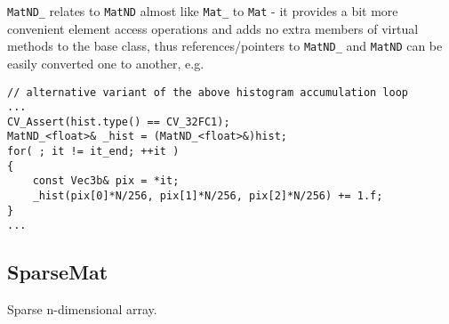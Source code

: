 \texttt{MatND\_} relates to \texttt{MatND}  almost like \texttt{Mat\_} to \texttt{Mat} - it provides a bit more convenient element access operations and adds no extra members of virtual methods to the base class, thus references/pointers to \texttt{MatND\_} and \texttt{MatND} can be easily converted one to another, e.g.

\begin{lstlisting}
// alternative variant of the above histogram accumulation loop
...
CV_Assert(hist.type() == CV_32FC1);
MatND_<float>& _hist = (MatND_<float>&)hist;
for( ; it != it_end; ++it )
{
    const Vec3b& pix = *it;
    _hist(pix[0]*N/256, pix[1]*N/256, pix[2]*N/256) += 1.f;
}
...
\end{lstlisting}

\subsection{SparseMat}\label{SparseMat}
Sparse n-dimensional array.

